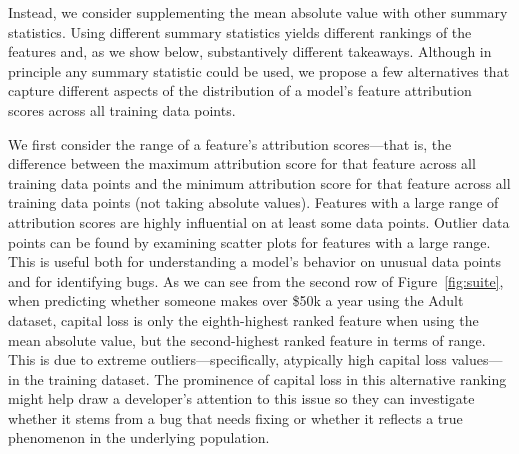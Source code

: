 \documentclass[11pt,dvipdfmx]{article}
\begin{document}
Instead, we consider supplementing the mean absolute value with other
summary statistics. Using different summary statistics yields
different rankings of the features and, as we show below,
substantively different takeaways. Although in principle any summary
statistic could be used, we propose a few alternatives that capture
different aspects of the distribution of a model's feature attribution
scores across all training data points.

We first consider the range of a feature's attribution scores---that
is, the difference between the maximum attribution score for that
feature across all training data points and the minimum attribution
score for that feature across all training data points (not taking
absolute values).  Features with a large range of attribution scores
are highly influential on at least some data points.  Outlier data
points can be found by examining scatter plots for features with a
large range.  This is useful both for understanding a model's behavior
on unusual data points and for identifying bugs.  As we can see from
the second row of Figure~\ref{fig:suite}, when predicting whether
someone makes over \$50k a year using the Adult dataset, capital loss
is only the eighth-highest ranked feature when using the mean absolute
value, but the second-highest ranked feature in terms of range. This
is due to extreme outliers---specifically, atypically high capital
loss values---in the training dataset. The prominence of capital loss
in this alternative ranking might help draw a developer's attention to
this issue so they can investigate whether it stems from a bug that
needs fixing or whether it reflects a true phenomenon in the
underlying population.
\end{document}
